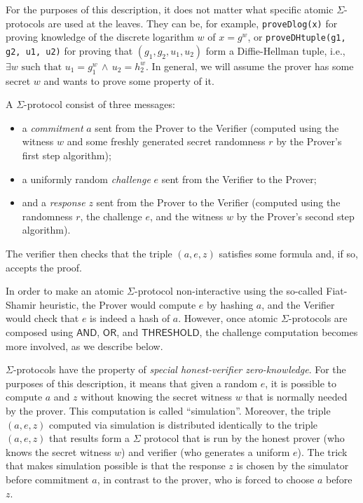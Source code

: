 \documentclass[11pt]{article}
\newcommand{\andnode}{\ensuremath{\mathsf{AND}}}
\newcommand{\ornode}{\ensuremath{\mathsf{OR}}}
\newcommand{\tnode}{\ensuremath{\mathsf{THRESHOLD}}}
\begin{document}
For the purposes of this description, it does not matter what specific atomic $\Sigma$-protocols are used at the leaves. They can be, for example, \texttt{proveDlog(x)} for proving knowledge of the discrete logarithm $w$ of $x=g^w$, or \texttt{proveDHtuple(g1, g2, u1, u2)} for proving that $(g_1, g_2, u_1, u_2)$ form a Diffie-Hellman tuple, i.e., $\exists w \mbox{\ such\  that\ } u_1 = g_1^w \, \wedge \, u_2 = h_2^w$. In general, we will assume the prover has some secret $w$ and wants to prove some property of it. 

A $\Sigma$-protocol consist of three messages: 

\begin{itemize}
\item a \emph{commitment} $a$ sent from the Prover to the Verifier (computed using the witness $w$ and some freshly generated secret randomness $r$ by the Prover's first step algorithm);
\item a uniformly random \emph{challenge} $e$ sent from the Verifier to the Prover;
\item and a \emph{response} $z$ sent from the Prover to the Verifier (computed using the randomness $r$, the challenge $e$, and the witness $w$ by the Prover's second step algorithm). 
\end{itemize}
The verifier then checks that the triple $(a, e, z)$ satisfies some formula and, if so, accepts the proof.

In order to make an atomic $\Sigma$-protocol non-interactive using the so-called Fiat-Shamir heuristic, the Prover would compute $e$ by hashing $a$, and the Verifier would check that $e$ is indeed a hash of $a$. However, once atomic $\Sigma$-protocols are composed using $\andnode$, $\ornode$, and $\tnode$, the challenge computation becomes more involved, as we describe below.

$\Sigma$-protocols have the property of \emph{special honest-verifier zero-knowledge}. For the purposes of this description, it means that given a random $e$, it is possible to compute $a$ and $z$ without knowing the secret witness $w$ that is normally needed by the prover. This computation is called ``simulation''. Moreover, the triple $(a, e, z)$  computed via simulation is distributed identically to the triple $(a, e, z)$ that results form a $\Sigma$ protocol that is run by the honest prover (who knows the secret witness $w$) and verifier (who generates a uniform $e$). The trick that makes simulation possible is that the response $z$ is chosen by the simulator before commitment $a$, in contrast to the prover, who is forced to choose $a$ before $z$.
\end{document}
